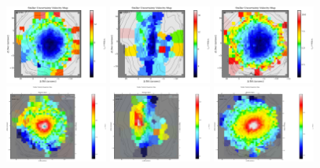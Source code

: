 \begin{figure}
      \includegraphics[width=0.3\textwidth]{chapter4/Vmaps/ic4296_stellar_vel_uncert.png}
      \includegraphics[width=0.3\textwidth]{chapter4/Vmaps/ngc0612_stellar_vel_uncert.png}
      \includegraphics[width=0.3\textwidth]{chapter4/Vmaps/ngc1399_stellar_vel_uncert.png}
      \\
      \includegraphics[width=0.3\textwidth]{chapter4/Vmaps/ic4296_stellar_sigma.png}
      \includegraphics[width=0.3\textwidth]{chapter4/Vmaps/ngc0612_stellar_sigma.png}
      \includegraphics[width=0.3\textwidth]{chapter4/Vmaps/ngc1399_stellar_sigma.png}

\end{figure}
